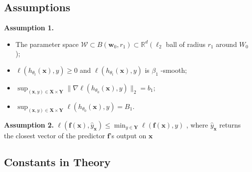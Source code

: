 \subsection{Assumptions}
\textbf{Assumption 1.}
\begin{itemize}
    \item The parameter space $\mathcal{W}\subset B(\mathbf{w}_{0},r_{1})\subset\mathbb{R}^{d}\left(\ell_{2}\right.$ ball of radius $r_1$ around $W_0$);
    \item $\ell(h_{\theta_t}(\mathbf{x}),y)\geq0$ and $\ell(h_{\theta_t}(\mathbf{x}),y)$ is $\beta_{1}$ -smooth;
    \item $\sup_{(\mathbf{x},y)\in\boldsymbol{X}\times\boldsymbol{Y}}\|\nabla\ell(h_{\theta_0}(\mathbf{x}),y)\|_{2}=b_{1};$
    \item $\sup_{(\mathbf{x},y)\in\boldsymbol{X}\times\boldsymbol{Y}}\ell(h_{\theta_0}(\mathbf{x}),y)=B_{1}.$
\end{itemize}

\textbf{Assumption 2.} 
$\ell(\mathbf{f}(\mathbf{x}),\widehat{y}_{\mathbf{x}})\leq\min_{y\in\boldsymbol{Y}}\ell(\mathbf{f}(\mathbf{x}),y)$ , where $\widehat{y}_{\mathbf{x}}$ returns the closest vector of the predictor $\mathbf{f}$'s output on $\mathbf{x}$

\subsection{Constants in Theory}

